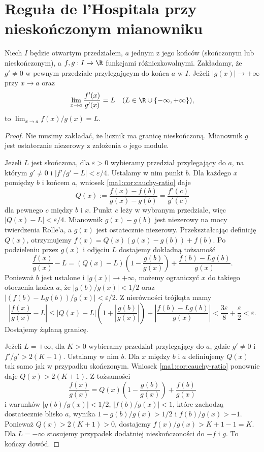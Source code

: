\section{Reguła de l'Hospitala przy nieskończonym mianowniku}
\begin{twierdzenie}
\label{ma1:thm:lhopital-infinity}
Niech $I$ będzie otwartym przedziałem, $a$ jednym z jego końców (skończonym lub nieskończonym), a $f,g:I\to\R$ funkcjami różniczkowalnymi. Zakładamy, że $g'\ne0$ w pewnym przedziale przylegającym do końca $a$ w $I$. Jeżeli $|g(x)|\to+\infty$ przy $x\to a$ oraz
\[
 \lim_{x\to a}\frac{f'(x)}{g'(x)}=L
 \quad (L\in\R\cup\{-\infty,+\infty\}),
\]
to $\lim_{x\to a}f(x)/g(x)=L$.
\end{twierdzenie}
\begin{proof}
Nie musimy zakładać, że licznik ma granicę nieskończoną. Mianownik $g$ jest ostatecznie niezerowy z założenia o jego module.

Jeżeli $L$ jest skończona, dla $\varepsilon>0$ wybieramy przedział przylegający do $a$, na którym $g'\ne0$ i $|f'/g'-L|<\varepsilon/4$. Ustalamy w nim punkt $b$. Dla każdego $x$ pomiędzy $b$ i końcem $a$, wniosek \ref{ma1:cor:cauchy-ratio} daje
\[
 Q(x):=\frac{f(x)-f(b)}{g(x)-g(b)}
 =\frac{f'(c)}{g'(c)}
\]
dla pewnego $c$ między $b$ i $x$. Punkt $c$ leży w wybranym przedziale, więc $|Q(x)-L|<\varepsilon/4$. Mianownik $g(x)-g(b)$ jest niezerowy na mocy twierdzenia Rolle'a, a $g(x)$ jest ostatecznie niezerowy. Przekształcając definicję $Q(x)$, otrzymujemy $f(x)=Q(x)(g(x)-g(b))+f(b)$. Po podzieleniu przez $g(x)$ i odjęciu $L$ dostajemy dokładną tożsamość
\[
 \frac{f(x)}{g(x)}-L
 =(Q(x)-L)\left(1-\frac{g(b)}{g(x)}\right)
 +\frac{f(b)-Lg(b)}{g(x)}.
\]
Ponieważ $b$ jest ustalone i $|g(x)|\to+\infty$, możemy ograniczyć $x$ do takiego otoczenia końca $a$, że $|g(b)/g(x)|<1/2$ oraz $|(f(b)-Lg(b))/g(x)|<\varepsilon/2$. Z nierówności trójkąta mamy
\[
 \left|\frac{f(x)}{g(x)}-L\right|
 \le |Q(x)-L|\left(1+\left|\frac{g(b)}{g(x)}\right|\right)
 +\left|\frac{f(b)-Lg(b)}{g(x)}\right|
 <\frac{3\varepsilon}{8}+\frac{\varepsilon}{2}<\varepsilon.
\] Dostajemy żądaną granicę.

Jeżeli $L=+\infty$, dla $K>0$ wybieramy przedział przylegający do $a$, gdzie $g'\ne0$ i $f'/g'>2(K+1)$. Ustalamy w nim $b$. Dla $x$ między $b$ i $a$ definiujemy $Q(x)$ tak samo jak w przypadku skończonym. Wniosek \ref{ma1:cor:cauchy-ratio} ponownie daje $Q(x)>2(K+1)$. Z tożsamości
\[
 \frac{f(x)}{g(x)}
 =Q(x)\left(1-\frac{g(b)}{g(x)}\right)+\frac{f(b)}{g(x)}
\]
i warunków $|g(b)/g(x)|<1/2$, $|f(b)/g(x)|<1$, które zachodzą dostatecznie blisko $a$, wynika $1-g(b)/g(x)>1/2$ i $f(b)/g(x)>-1$. Ponieważ $Q(x)>2(K+1)>0$, dostajemy $f(x)/g(x)>K+1-1=K$. Dla $L=-\infty$ stosujemy przypadek dodatniej nieskończoności do $-f$ i $g$. To kończy dowód.
\end{proof}
